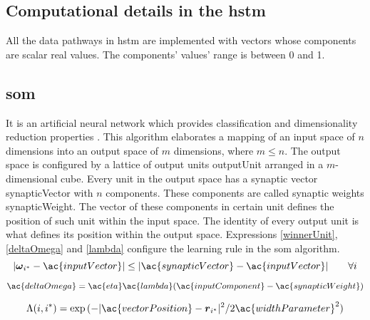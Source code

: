 \documentclass[11pt,a4paper]{article}
\begin{document}
\clearpage
\begin{appendices}

\section{Computational details in the \ac{hstm}} \label{comp}

All the data pathways in \ac{hstm} are implemented with vectors
whose components are scalar real values.
The components' values' range is between 0 and 1.\\

\subsection{\ac{som}} \label{som}

It is an artificial neural network which provides classification and dimensionality
reduction properties \cite{kohonen82, kohonen89}.
This algorithm elaborates a mapping of an input space of $n$ dimensions
into an output space of $m$ dimensions, where $m \leq n$.
The output space is configured by a lattice of output units \ac{outputUnit} arranged in a $m$-dimensional cube.
Every unit in the output space has a synaptic vector \ac{synapticVector} with $n$ components.
These components are called synaptic weights \ac{synapticWeight}.
The vector of these components in certain unit defines the position of such unit within the input space.
The identity of every output unit is what defines its position within the output space.
Expressions \ref{winnerUnit}, \ref{deltaOmega} and \ref{lambda} configure the learning rule in the \ac{som} algorithm.\\

\begin{equation} \label{winnerUnit}
|\boldsymbol{\omega}_{i^*} - \ac{inputVector}| \leq |\ac{synapticVector} - \ac{inputVector}| \quad \quad \forall i
\end{equation}

\begin{equation} \label{deltaOmega}
\ac{deltaOmega} = \ac{eta} \ac{lambda}(\ac{inputComponent} - \ac{synapticWeight})
\end{equation}

\begin{equation} \label{lambda}
\Lambda(i,i^*) = \exp{ ({- |{\ac{vectorPosition} - \boldsymbol{r}_{i^*}}|^2}/{2\ac{widthParameter}^2}) }
\end{equation}\\


\end{appendices}
\end{document}
